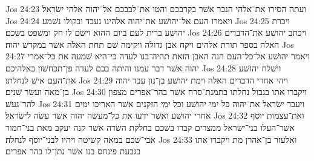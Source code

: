 Jos 24:23  ועתה הסירו את־אלהי הנכר אשׁר בקרבכם והטו את־לבבכם אל־יהוה אלהי ישׂראל׃
Jos 24:24  ויאמרו העם אל־יהושׁע את־יהוה אלהינו נעבד ובקולו נשׁמע׃
Jos 24:25  ויכרת יהושׁע ברית לעם ביום ההוא וישׂם לו חק ומשׁפט בשׁכם׃
Jos 24:26  ויכתב יהושׁע את־הדברים האלה בספר תורת אלהים ויקח אבן גדולה ויקימה שׁם תחת האלה אשׁר במקדשׁ יהוה׃
Jos 24:27  ויאמר יהושׁע אל־כל־העם הנה האבן הזאת תהיה־בנו לעדה כי־היא שׁמעה את כל־אמרי יהוה אשׁר דבר עמנו והיתה בכם לעדה פן־תכחשׁון באלהיכם׃
Jos 24:28  וישׁלח יהושׁע את־העם אישׁ לנחלתו׃
Jos 24:29  ויהי אחרי הדברים האלה וימת יהושׁע בן־נון עבד יהוה בן־מאה ועשׂר שׁנים׃
Jos 24:30  ויקברו אתו בגבול נחלתו בתמנת־סרח אשׁר בהר־אפרים מצפון להר־געשׁ׃
Jos 24:31  ויעבד ישׂראל את־יהוה כל ימי יהושׁע וכל ימי הזקנים אשׁר האריכו ימים אחרי יהושׁע ואשׁר ידעו את כל־מעשׂה יהוה אשׁר עשׂה לישׂראל׃
Jos 24:32  ואת־עצמות יוסף אשׁר־העלו בני־ישׂראל ממצרים קברו בשׁכם בחלקת השׂדה אשׁר קנה יעקב מאת בני־חמור אבי־שׁכם במאה קשׂיטה ויהיו לבני־יוסף לנחלה׃
Jos 24:33  ואלעזר בן־אהרן מת ויקברו אתו בגבעת פינחס בנו אשׁר נתן־לו בהר אפרים׃


